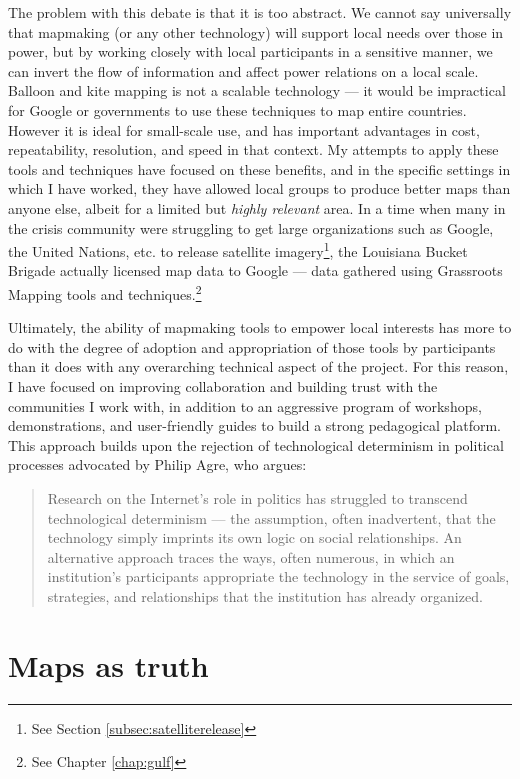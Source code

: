 \documentclass[11pt,oneside,notitlepage]{report}
\begin{document}
{{The problem with this debate is that it is too abstract. We cannot say universally that mapmaking (or any other technology) will support local needs over those in power, but by working closely with local participants in a sensitive manner, we can invert the flow of information and affect power relations on a local scale. Balloon and kite mapping is not a scalable technology --- it would be impractical for Google or governments to use these techniques to map entire countries. However it is ideal for small-scale use, and has important advantages in cost, repeatability, resolution, and speed in that context. My attempts to apply these tools and techniques have focused on these benefits, and in the specific settings in which I have worked, they have allowed local groups to produce better maps than anyone else, albeit for a limited but \emph{highly relevant} area. In a time when many in the crisis community were struggling to get large organizations such as Google, the United Nations, etc. to release satellite imagery\footnote{See Section \ref{subsec:satelliterelease}}, the Louisiana Bucket Brigade actually licensed map data to Google --- data gathered using Grassroots Mapping tools and techniques.\footnote{See Chapter \ref{chap:gulf}} 

Ultimately, the ability of mapmaking tools to empower local interests has more to do with the degree of adoption and appropriation of those tools by participants than it does with any overarching technical aspect of the project. For this reason, I have focused on improving collaboration and building trust with the communities I work with, in addition to an aggressive program of workshops, demonstrations, and user-friendly guides to build a strong pedagogical platform. This approach builds upon the rejection of technological determinism in political processes advocated by Philip Agre, who argues: 

\begin{quote}
Research on the Internet's role in politics has struggled to transcend technological determinism --- the assumption, often inadvertent, that the technology simply imprints its own logic on social relationships. An alternative approach traces the ways, often numerous, in which an institution's participants appropriate the technology in the service of goals, strategies, and relationships that the institution has already organized. \cite{agre2002realtime} 
\end{quote}

\section{Maps as truth}
\label{sec:truth}

}}
\end{document}
